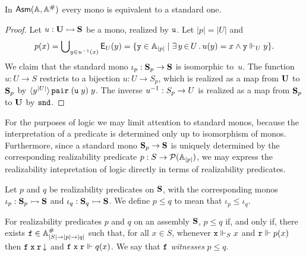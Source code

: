 \begin{proposition}
  In $\mathsf{Asm}(\mathbb{A},\mathbb{A}^{\#})$ every mono is equivalent to a standard one.
\end{proposition}

\begin{proof}
  Let $u : \mathbf{U} \rightarrowtail \mathbf{S}$ be a mono, realized by $\mathtt{u}$.
  Let $|p| = |U|$ and
  \begin{equation*}
    p(x) = \bigcup\nolimits_{y \in {u}^{-1}(x)} \mathsf{E}_U(y) =
    \{\mathtt{y} \in \mathbb{A}_{|p|} \mid \exists\, y \,{\in}\, U\,.\,u(y) = x \land \mathtt{y} \Vdash_U y\}.
  \end{equation*}
  We claim that the standard mono $\iota_p : \mathbf{S}_p \to \mathbf{S}$ is
  isomorphic to~$u$. The function $u : U \to S$ restricts to a
  bijection $u : U \to S_p$, which is realized as a map from $\mathbf{U}$
  to $\mathbf{S}_p$ by
  $\langle y^{|U|} \rangle\,\mathtt{pair}\;(\mathtt{u}\;y)\;y$. The inverse
  ${u}^{-1} : S_p \to U$ is realized as a map from $\mathbf{S}_p$ to
  $\mathbf{U}$ by $\mathtt{snd}$.
\end{proof}

For the purposes of logic we may limit attention to standard monos,
because the interpretation of a predicate is determined only up to
isomorphism of monos. Furthermore, since a standard mono $\mathbf{S}_p
\to \mathbf{S}$ is uniquely determined by the corresponding realizability
predicate $p : S \to \mathcal{P}(\mathbb{A}_{|p|})$, we may express the
realizability intepretation of logic directly in terms of
realizability predicates.

Let $p$ and $q$ be realizability predicates on $\mathbf{S}$, with the
corresponding monos $\iota_p : \mathbf{S}_p \rightarrowtail \mathbf{S}$ and $\iota_q
: \mathbf{S}_q \rightarrowtail \mathbf{S}$. We define $p \leq q$ to mean that
$\iota_p \leq \iota_q$.

\begin{lemma}
  \label{lemma:realizability-predicate-leq}%
  For realizability predicates $p$ and $q$ on an assembly $\mathbf{S}$,
  $p \leq q$ if, and only if, there exists $\mathtt{f} \in \mathbb{A}^{\#}_{|S|
    \to |p| \to |q|}$ such that, for all $x \in S$, whenever $\mathtt{x}
  \Vdash_S x$ and $\mathtt{r} \Vdash p(x)$ then $\mathtt{f}\;\mathtt{x}\;\mathtt{r}\,{\downarrow}$
  and $\mathtt{f}\;\mathtt{x}\;\mathtt{r} \Vdash q(x)$. We say that $\mathtt{f}$
  \emph{witnesses} $p \leq q$.
\end{lemma}

